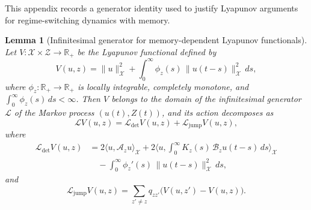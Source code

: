 \documentclass[12pt,a4paper]{article}
\theoremstyle{plain}
\newtheorem{lemma}[theorem]{Lemma}
\theoremstyle{definition}
\theoremstyle{remark}
\begin{document}
	This appendix records a generator identity used to justify Lyapunov arguments
	for regime-switching dynamics with memory.
	
	\begin{lemma}[Infinitesimal generator for memory-dependent Lyapunov functionals]
		\label{app:lem:generator}
		Let $V:\mathcal{X}\times\mathcal{Z}\to\mathbb{R}_+$ be the Lyapunov functional
		defined by
		\begin{equation}
			\label{app:eq:Lyap-memory}
			V(u,z)
			=
			\|u\|_{\mathcal{X}}^2
			+
			\int_0^\infty \phi_z(s)\,\|u(t-s)\|_{\mathcal{X}}^2\,ds,
		\end{equation}
		where $\phi_z:\mathbb{R}_+\to\mathbb{R}_+$ is locally integrable, completely
		monotone, and $\int_0^\infty \phi_z(s)\,ds<\infty$.
		Then $V$ belongs to the domain of the infinitesimal generator $\mathcal{L}$ of
		the Markov process $(u(t),Z(t))$, and its action decomposes as
		\begin{equation}
			\label{app:eq:generator-decomposition}
			\mathcal{L}V(u,z)
			=
			\mathcal{L}_{\mathrm{det}}V(u,z)
			+
			\mathcal{L}_{\mathrm{jump}}V(u,z),
		\end{equation}
		where
		\begin{align}
			\label{app:eq:generator-det}
			\mathcal{L}_{\mathrm{det}}V(u,z)
			&=
			2\langle u,\mathcal{A}_z u\rangle_{\mathcal{X}}
			+
			2\Big\langle
			u,
			\int_0^\infty K_z(s)\,\mathcal{B}_z u(t-s)\,ds
			\Big\rangle_{\mathcal{X}}
			\nonumber\\
			&\quad
			-
			\int_0^\infty \phi_z'(s)\,\|u(t-s)\|_{\mathcal{X}}^2\,ds,
		\end{align}
		and
		\begin{equation}
			\label{app:eq:generator-jump}
			\mathcal{L}_{\mathrm{jump}}V(u,z)
			=
			\sum_{z'\neq z} q_{zz'}\big(V(u,z')-V(u,z)\big).
		\end{equation}
	\end{lemma}
	
\end{document}
